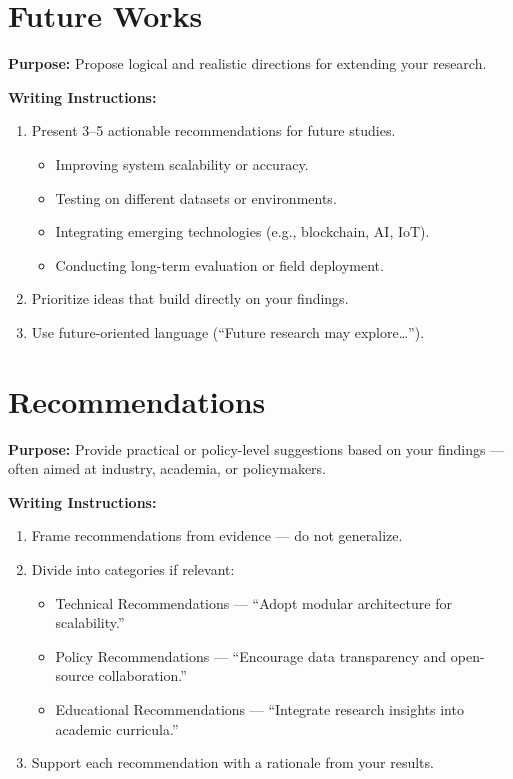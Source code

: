 \section{Future Works}

{\color{blue}\textbf{Purpose:}
Propose logical and realistic directions for extending your research.} \\

{\color{red}\textbf{Writing Instructions:}
\begin{enumerate}
    \item Present 3–5 actionable recommendations for future studies.
    \begin{itemize}
        \item Improving system scalability or accuracy.
        \item Testing on different datasets or environments.
        \item Integrating emerging technologies (e.g., blockchain, AI, IoT).
        \item Conducting long-term evaluation or field deployment.
    \end{itemize}
    
    \item Prioritize ideas that build directly on your findings.
    
    \item Use future-oriented language (``Future research may explore…'').
\end{enumerate}}


\section{Recommendations}

{\color{blue}\textbf{Purpose:}
Provide practical or policy-level suggestions based on your findings — often aimed at industry, academia, or policymakers.} \\

{\color{red}\textbf{Writing Instructions:}
\begin{enumerate}
    \item Frame recommendations from evidence — do not generalize.
    
    \item Divide into categories if relevant:
    \begin{itemize}
        \item Technical Recommendations — ``Adopt modular architecture for scalability.''
        \item Policy Recommendations — ``Encourage data transparency and open-source collaboration.''
        \item Educational Recommendations — ``Integrate research insights into academic curricula.''
    \end{itemize}
    
    \item Support each recommendation with a rationale from your results.
\end{enumerate}}


